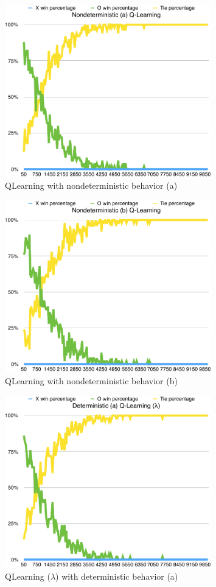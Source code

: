 \documentclass{journal}
\begin{document}
\begin{figure}[h]
	\includegraphics[width=0.8\textwidth]{QLearningN(a).pdf}
	\caption{QLearning with nondeterministic behavior (a)}\label{fig:QNA}
\end{figure}
\begin{figure}[h]
	\includegraphics[width=0.8\textwidth]{QLearningN(b).pdf}
	\caption{QLearning with nondeterministic behavior (b)}\label{fig:QNB}
\end{figure}
\begin{figure}[h]
	\includegraphics[width=0.8\textwidth]{QLearningLD(a).pdf}
	\caption{QLearning ($\lambda{}$) with deterministic behavior (a)}\label{fig:QLDA}
\end{figure}
\end{document}
